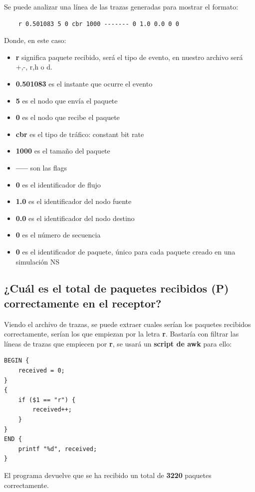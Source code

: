 \documentclass{article}
\begin{document}
Se puede analizar una línea de las trazas generadas para mostrar el formato:

\begin{verbatim}
    r 0.501083 5 0 cbr 1000 ------- 0 1.0 0.0 0 0
\end{verbatim}

Donde, en este caso:
\begin{itemize}
	\item \textbf{r} significa paquete recibido, será el tipo de evento, en nuestro archivo será +,-, r,h o d.
	\item \textbf{0.501083} es el instante que ocurre el evento
	\item \textbf{5} es el nodo que envía el paquete
	\item \textbf{0} es el nodo que recibe el paquete
	\item \textbf{cbr} es el tipo de tráfico: constant bit rate
	\item \textbf{1000} es el tamaño del paquete
	\item \textbf{-----} son las flags
	\item \textbf{0} es el identificador de flujo
	\item \textbf{1.0} es el identificador del nodo fuente
	\item \textbf{0.0} es el identificador del nodo destino
	\item \textbf{0} es el número de secuencia
	\item \textbf{0} es el identificador de paquete, único para cada paquete creado en una simulación NS
\end{itemize}

\subsection{¿Cuál es el total de paquetes recibidos (P) correctamente en el receptor?}


Viendo el archivo de trazas, se puede extraer cuales serían los paquetes recibidos correctamente, serían los que empiezan por la letra \textbf{r}. Bastaría con filtrar las líneas de trazas que empiecen por \textbf{r}, se usará un \textbf{script de awk} para ello:


\begin{verbatim}
BEGIN {
    received = 0;
}
{
    if ($1 == "r") {
        received++;
    }
}
END {
    printf "%d", received;
}
\end{verbatim}

El programa devuelve que se ha recibido un total de \textbf{3220} paquetes correctamente.
\end{document}
